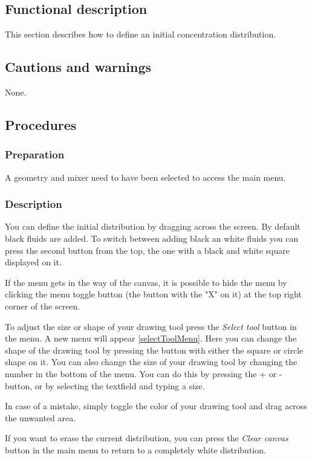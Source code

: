 \subsection{Functional description}
This section describes how to define an initial concentration distribution.

\subsection{Cautions and warnings}
None.

\subsection{Procedures}
\subsubsection{Preparation}
A geometry and mixer need to have been selected to access the main menu.

\subsubsection{Description}
You can define the initial distribution by dragging across the screen. By default black fluids are added. To switch between adding black an white fluids you can press the second button from the top, the one with a black and white square displayed on it.

If the menu gets in the way of the canvas, it is possible to hide the menu by clicking the menu toggle button (the button with the "X" on it) at the top right corner of the screen.

 To adjust the size or shape of your drawing tool press the \emph{Select tool} button in the menu. A new menu will appear \ref{selectToolMenu}. Here you can change the shape of the drawing tool by pressing the button with either the square or circle shape on it. You can also change the size of your drawing tool by changing the number in the bottom of the menu. You can do this by pressing the + or - button, or by selecting the textfield and typing a size.


In case of a mistake, simply toggle the color of your drawing tool and drag across the unwanted area.

If you want to erase the current distribution, you can press the \emph{Clear canvas} button in the main menu to return to a completely white distribution.

